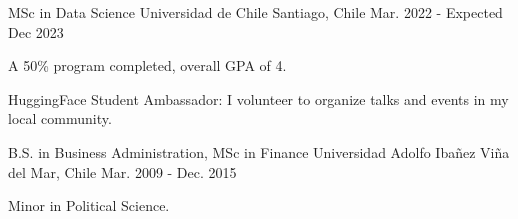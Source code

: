 

\begin{cventries}


  \cventry
    {MSc in Data Science} %
    {Universidad de Chile} %
    {Santiago, Chile} %
    {Mar. 2022 - Expected Dec 2023} %
    {
      \begin{cvitems} %
	\item{A 50\% program completed, overall GPA of 4.}
	\item {HuggingFace Student Ambassador: I volunteer to organize talks and
events in  my local community.}
      \end{cvitems}
    }
    
  \cventry
    {B.S. in Business Administration, MSc in Finance} %
    {Universidad Adolfo Ibañez} %
    {Viña del Mar, Chile} %
    {Mar. 2009 - Dec. 2015} %
    {
      \begin{cvitems} %
        \item {Minor in Political Science.}
      \end{cvitems}
    }

\end{cventries}
